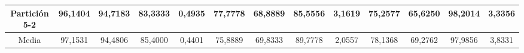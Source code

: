 \documentclass[12pt]{article}
\begin{document}
\begin{table}[H]
{\begin{tabular}{|c|cccc|cccc|cccc|}
Partición 5-2 & \multicolumn{1}{c|}{96,1404}                                                  & \multicolumn{1}{c|}{94,7183}                                                 & \multicolumn{1}{c|}{83,3333} & 0,4935 & \multicolumn{1}{c|}{77,7778}                                                  & \multicolumn{1}{c|}{68,8889}                                                 & \multicolumn{1}{c|}{85,5556} & 3,1619 & \multicolumn{1}{c|}{75,2577}                                                  & \multicolumn{1}{c|}{65,6250}                                                 & \multicolumn{1}{c|}{98,2014} & 3,3356 \\ \hline
Media         & \multicolumn{1}{c|}{97,1531}                                                  & \multicolumn{1}{c|}{94,4806}                                                 & \multicolumn{1}{c|}{85,4000} & 0,4401 & \multicolumn{1}{c|}{75,8889}                                                  & \multicolumn{1}{c|}{69,8333}                                                 & \multicolumn{1}{c|}{89,7778} & 2,0557 & \multicolumn{1}{c|}{78,1368}                                                  & \multicolumn{1}{c|}{69,2762}                                                 & \multicolumn{1}{c|}{97,9856} & 3,8331 \\ \hline
\end{tabular}}
\end{table}
\end{document}
